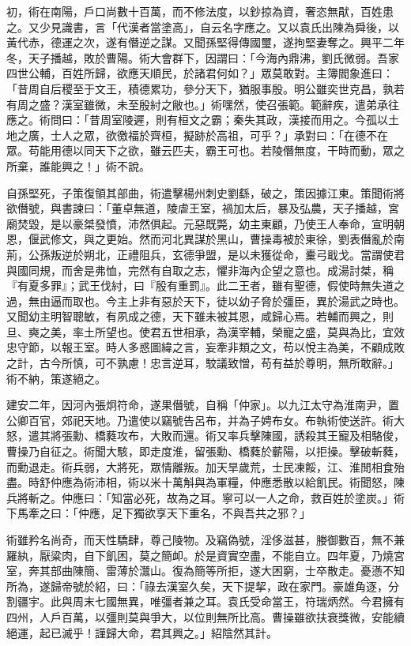 \begin{pinyinscope}
初，術在南陽，戶口尚數十百萬，而不修法度，以鈔掠為資，奢恣無猒，百姓患之。又少見識書，言「代漢者當塗高」，自云名字應之。又以袁氏出陳為舜後，以黃代赤，德運之次，遂有僭逆之謀。又聞孫堅得傳國璽，遂拘堅妻奪之。興平二年冬，天子播越，敗於曹陽。術大會群下，因謂曰：「今海內鼎沸，劉氏微弱。吾家四世公輔，百姓所歸，欲應天順民，於諸君何如？」眾莫敢對。主簿閻象進曰：「昔周自后稷至于文王，積德累功，參分天下，猶服事殷。明公雖奕世克昌，孰若有周之盛？漢室雖微，未至殷紂之敝也。」術嘿然，使召張範。範辭疾，遣弟承往應之。術問曰：「昔周室陵遲，則有桓文之霸；秦失其政，漢接而用之。今孤以土地之廣，士人之眾，欲徼福於齊桓，擬跡於高祖，可乎？」承對曰：「在德不在眾。苟能用德以同天下之欲，雖云匹夫，霸王可也。若陵僭無度，干時而動，眾之所棄，誰能興之！」術不說。

自孫堅死，子策復領其部曲，術遣擊楊州刺史劉繇，破之，策因據江東。策聞術將欲僭號，與書諫曰：「董卓無道，陵虐王室，禍加太后，暴及弘農，天子播越，宮廟焚毀，是以豪桀發憤，沛然俱起。元惡既斃，幼主東顧，乃使王人奉命，宣明朝恩，偃武修文，與之更始。然而河北異謀於黑山，曹操毒被於東徐，劉表僭亂於南荊，公孫叛逆於朔北，正禮阻兵，玄德爭盟，是以未獲從命，櫜弓戢戈。當謂使君與國同規，而舍是弗恤，完然有自取之志，懼非海內企望之意也。成湯討桀，稱『有夏多罪』；武王伐紂，曰『殷有重罰』。此二王者，雖有聖德，假使時無失道之過，無由逼而取也。今主上非有惡於天下，徒以幼子脅於彊臣，異於湯武之時也。又聞幼主明智聰敏，有夙成之德，天下雖未被其恩，咸歸心焉。若輔而興之，則旦、奭之美，率土所望也。使君五世相承，為漢宰輔，榮寵之盛，莫與為比，宜效忠守節，以報王室。時人多惑圖緯之言，妄牽非類之文，苟以悅主為美，不顧成敗之計，古今所慎，可不孰慮！忠言逆耳，駮議致憎，苟有益於尊明，無所敢辭。」術不納，策遂絕之。

建安二年，因河內張炯符命，遂果僭號，自稱「仲家」。以九江太守為淮南尹，置公卿百官，郊祀天地。乃遣使以竊號告呂布，并為子娉布女。布執術使送許。術大怒，遣其將張勳、橋蕤攻布，大敗而還。術又率兵擊陳國，誘殺其王寵及相駱俊，曹操乃自征之。術聞大駭，即走度淮，留張勳、橋蕤於蘄陽，以拒操。擊破斬蕤，而勳退走。術兵弱，大將死，眾情離叛。加天旱歲荒，士民凍餒，江、淮閒相食殆盡。時舒仲應為術沛相，術以米十萬斛與為軍糧，仲應悉散以給飢民。術聞怒，陳兵將斬之。仲應曰：「知當必死，故為之耳。寧可以一人之命，救百姓於塗炭。」術下馬牽之曰：「仲應，足下獨欲享天下重名，不與吾共之邪？」

術雖矜名尚奇，而天性驕肆，尊己陵物。及竊偽號，淫侈滋甚，媵御數百，無不兼羅紈，厭粱肉，自下飢困，莫之簡卹。於是資實空盡，不能自立。四年夏，乃燒宮室，奔其部曲陳簡、雷薄於灊山。復為簡等所拒，遂大困窮，士卒散走。憂懣不知所為，遂歸帝號於紹，曰：「祿去漢室久矣，天下提挈，政在家門。豪雄角逐，分割疆宇。此與周末七國無異，唯彊者兼之耳。袁氏受命當王，符瑞炳然。今君擁有四州，人戶百萬，以彊則莫與爭大，以位則無所比高。曹操雖欲扶衰獎微，安能續絕運，起已滅乎！謹歸大命，君其興之。」紹陰然其計。


\end{pinyinscope}
